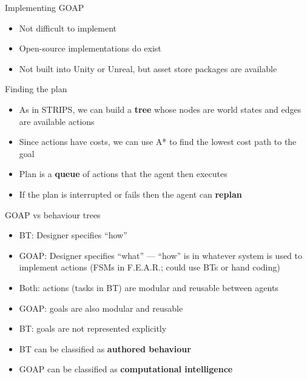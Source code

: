 \begin{frame}{Implementing GOAP}
    \begin{itemize}
        \pause\item Not difficult to implement
        \pause\item Open-source implementations do exist
        \pause\item Not built into Unity or Unreal, but asset store packages are available
    \end{itemize}
\end{frame}

\begin{frame}{Finding the plan}
    \begin{itemize}
        \pause\item As in STRIPS, we can build a \textbf{tree} whose nodes are world states and edges are available actions
        \pause\item Since actions have costs, we can use A* to find the lowest cost path to the goal
        \pause\item Plan is a \textbf{queue} of actions that the agent then executes
        \pause\item If the plan is interrupted or fails then the agent can \textbf{replan}
    \end{itemize}
\end{frame}

\begin{frame}{GOAP vs behaviour trees}
    \begin{itemize}
        \pause\item BT: Designer specifies ``how''
        \pause\item GOAP: Designer specifies ``what'' --- ``how'' is in whatever system is used to implement
            actions (FSMs in F.E.A.R.; could use BTs or hand coding)
        \pause\item Both: actions (tasks in BT) are modular and reusable between agents
        \pause\item GOAP: goals are also modular and reusable
        \pause\item BT: goals are not represented explicitly
        \pause\item BT can be classified as \textbf{authored behaviour}
        \pause\item GOAP can be classified as \textbf{computational intelligence}
    \end{itemize}
\end{frame}

